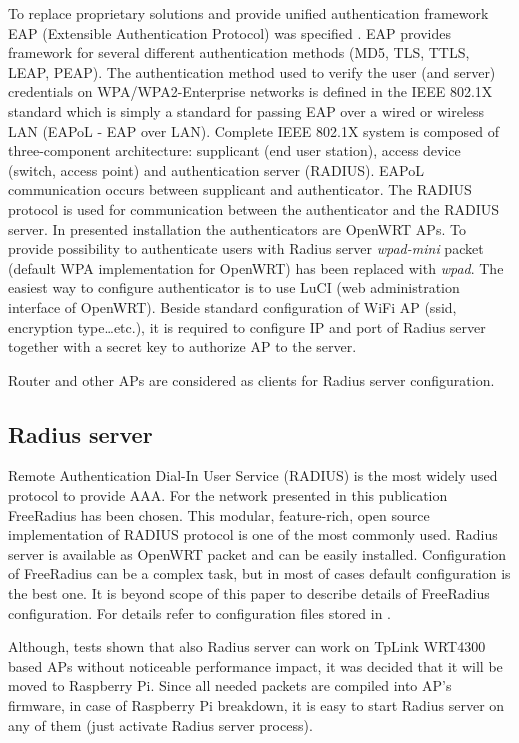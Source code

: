 \documentclass{llncs}
\begin{document}
To replace proprietary solutions and provide unified authentication framework EAP (Extensible Authentication Protocol) was specified \cite{rfc3748}. EAP provides framework for several different authentication methods (MD5, TLS, TTLS, LEAP, PEAP). The authentication method used to verify the user (and server) credentials on WPA/WPA2-Enterprise networks is defined in the IEEE 802.1X standard which is simply a standard for passing EAP over a wired or wireless LAN (EAPoL - EAP over LAN). Complete IEEE 802.1X system is composed of three-component architecture: supplicant (end user station), access device (switch, access point) and authentication server (RADIUS).  EAPoL communication occurs between supplicant and authenticator. The RADIUS protocol is used for communication between the authenticator and the RADIUS server. In presented installation the authenticators are OpenWRT APs. To provide possibility to authenticate users with Radius server \textit{wpad-mini} packet (default WPA implementation for OpenWRT) has been replaced with \textit{wpad}. The easiest way to configure authenticator is to use LuCI (web administration interface of OpenWRT). Beside standard configuration of WiFi AP (ssid, encryption type\ldots etc.), it is required to configure IP and port of Radius server together with a secret key to authorize AP to the server. 


Router and other APs are considered as clients for Radius server configuration. 


\subsection{Radius server}

Remote Authentication Dial-In User Service (RADIUS) \cite{rfc2865} is the most widely used protocol to provide AAA. For the network presented in this publication FreeRadius \cite{freeRadius} has been chosen. This modular, feature-rich, open source implementation of RADIUS protocol is one of the most commonly used. Radius server is available as OpenWRT packet and can be easily installed. Configuration of FreeRadius can be a complex task, but in most of cases default configuration is the best one. It is beyond scope of this paper to describe details of FreeRadius configuration. For details refer to configuration files stored in \cite{GitHub}.

Although, tests shown that also Radius server can work on TpLink WRT4300 based APs without noticeable performance impact, it was decided that it will be moved to Raspberry Pi. Since all needed packets are compiled into AP's firmware, in case of Raspberry Pi breakdown, it is easy to start Radius server on any of them (just activate Radius server process). 
\end{document}
